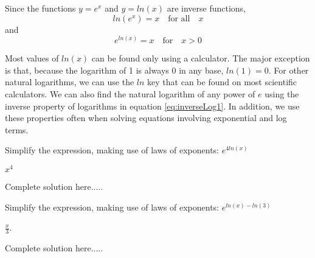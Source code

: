 \begin{tcolorbox}[title = {Inverse Properties of Logarithms}]

Since the functions $y=e^x$ and $y=ln(x)$ are inverse functions,
\begin{equation}\label{eq:inverseLog1}
    ln(e^x)=x \quad \text{for all}\quad x
\end{equation}
and
\begin{equation}\label{eq:inverseLog2}
    e^{ln(x)}=x \quad \text{for}\quad x>0
\end{equation}

\end{tcolorbox}
\noindent Most values of $ln(x)$ can be found only using a calculator. The major exception is that, because the logarithm of 1 is always 0 in any base, $ln(1)=0$. For other natural logarithms, we can use the $ln$ key that can be found on most scientific calculators.  We can also find the natural logarithm of any power of $e$ using the inverse property of logarithms in equation \ref{eq:inverseLog1}. 
In addition, we use these properties often when solving equations involving exponential and log terms.\\%
\begin{example}
Simplify the expression, making use of laws of exponents: $e^{4ln(x)}$
    \begin{sol}
    $x^4$
    \end{sol}
    \begin{solL}
    Complete solution here.....
    
    \end{solL}
    
\end{example}
\begin{example}
Simplify the expression, making use of laws of exponents: $e^{ln(x)-ln(3)}$
    \begin{sol}
    $\displaystyle\frac{x}{3}$.
    \end{sol}
    \begin{solL}
    Complete solution here.....
    
    \end{solL}
    
\end{example}
